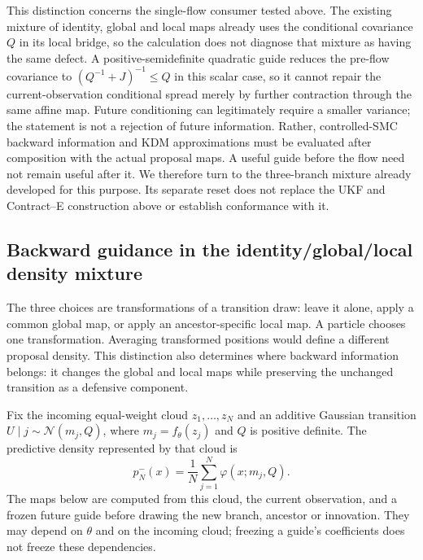 This distinction concerns the single-flow consumer tested above. The existing
mixture of identity, global and local maps already uses the conditional covariance $Q$ in
its local bridge, so the calculation does not diagnose that mixture as having
the same defect. A positive-semidefinite
quadratic guide reduces the pre-flow covariance to
$(Q^{-1}+J)^{-1}\leq Q$ in this scalar case, so it cannot repair the
current-observation conditional spread merely by further contraction through
the same affine map. Future conditioning can legitimately require a smaller
variance; the statement is not a rejection of future information. Rather,
controlled-SMC backward information and KDM approximations must be evaluated
after composition with the actual proposal maps. A useful guide before the
flow need not remain useful after it. We therefore turn to the three-branch
mixture already developed for this purpose. Its separate reset does not
replace the UKF and Contract--E construction above or establish conformance
with it.

\subsection{Backward guidance in the identity/global/local density mixture}
\label{sec:bg-three-map-mixture}

The three choices are transformations of a transition draw: leave it alone,
apply a common global map, or apply an ancestor-specific local map. A particle
chooses one transformation. Averaging transformed positions would define a
different proposal density. This distinction also determines where backward
information belongs: it changes the global and local maps while preserving
the unchanged transition as a defensive component.

Fix the incoming equal-weight cloud $z_1,\ldots,z_N$ and an additive Gaussian
transition $U\mid j\sim\mathcal N(m_j,Q)$, where $m_j=f_\theta(z_j)$ and $Q$
is positive definite. The predictive density represented by that cloud is
\begin{equation}
 p_N^-(x)=\frac1N\sum_{j=1}^N\varphi(x;m_j,Q).
 \label{eq:bg-mixture-predictive}
\end{equation}
The maps below are computed from this cloud, the current observation, and a
frozen future guide before drawing the new branch, ancestor or innovation.
They may depend on $\theta$ and on the incoming cloud; freezing a guide's
coefficients does not freeze these dependencies.

